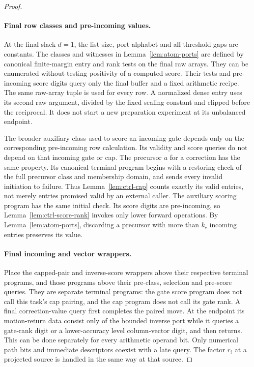 \documentclass[11pt]{article}
\numberwithin{equation}{section}
\theoremstyle{definition}
\theoremstyle{remark}
\begin{document}
\begin{proof}
\paragraph{Final row classes and pre-incoming values.}
At the final slack $d=1$, the list size, port alphabet and all threshold
gaps are constants.  The classes and witnesses in
Lemma~\ref{lem:atom-ports} are defined by canonical finite-margin entry
and rank tests on the final raw arrays.  They can be enumerated without
testing positivity of a computed score.  Their tests and pre-incoming
score digits query only the final buffer and a fixed arithmetic recipe.
The same raw-array tuple is used for every row.  A normalized dense
entry uses its second raw argument, divided by the fixed scaling
constant and clipped before the reciprocal.  It does not start a new
preparation experiment at its unbalanced endpoint.

The broader auxiliary class used to score an incoming gate depends
only on the corresponding pre-incoming row calculation.  Its validity
and score queries do not depend on that incoming gate or cap.  The
precursor ${a}$ for a correction has the same property.  Its canonical
terminal program begins with a restoring check of the full precursor
class and membership domain, and sends every invalid initiation to
failure.  Thus Lemma~\ref{lem:ctrl-cap} counts exactly its valid entries,
not merely entries promised valid by an external caller.  The auxiliary
scoring program has the same initial check.  Its score digits are
pre-incoming, so Lemma~\ref{lem:ctrl-score-rank} invokes only lower
forward operations.  By Lemma~\ref{lem:atom-ports}, discarding a
precursor with more than ${k}_c$ incoming entries preserves its value.

\paragraph{Final incoming and vector wrappers.}
Place the capped-pair and inverse-score wrappers above their respective
terminal programs, and those programs above their pre-class, selection
and pre-score queries.  They are separate terminal programs: the gate
score program does not call this task's cap pairing, and the cap
program does not call its gate rank.  A final correction-value query
first completes the paired move.  At the endpoint its motion-return data consist only of the
bounded inverse port while it queries a gate-rank digit or a lower-accuracy level
column-vector digit, and then returns.  This can be done separately for
every arithmetic operand bit.  Only numerical path bits and immediate
descriptors coexist with a late query.  The factor $r_i$ at a projected
source is handled in the same way at that source.


\end{proof}
\end{document}
